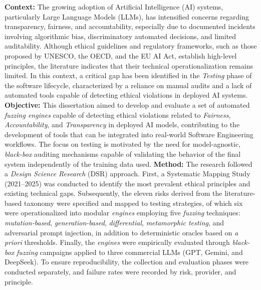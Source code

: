 \textbf{Context:} The growing adoption of Artificial Intelligence (AI) systems, particularly Large Language Models (LLMs), has intensified concerns regarding transparency, fairness, and accountability, especially due to documented incidents involving algorithmic bias, discriminatory automated decisions, and limited auditability. Although ethical guidelines and regulatory frameworks, such as those proposed by UNESCO, the OECD, and the EU AI Act, establish high-level principles, the literature indicates that their technical operationalization remains limited. In this context, a critical gap has been identified in the \textit{Testing} phase of the software lifecycle, characterized by a reliance on manual audits and a lack of automated tools capable of detecting ethical violations in deployed AI systems.
\textbf{Objective:} This dissertation aimed to develop and evaluate a set of automated \textit{fuzzing engines} capable of detecting ethical violations related to \textit{Fairness}, \textit{Accountability}, and \textit{Transparency} in deployed AI models, contributing to the development of tools that can be integrated into real-world Software Engineering workflows. The focus on testing is motivated by the need for model-agnostic, \textit{black-box} auditing mechanisms capable of validating the behavior of the final system independently of the training data used.
\textbf{Method:} The research followed a \textit{Design Science Research} (DSR) approach. First, a Systematic Mapping Study (2021--2025) was conducted to identify the most prevalent ethical principles and existing technical gaps. Subsequently, the eleven risks derived from the literature-based taxonomy were specified and mapped to testing strategies, of which six were operationalized into modular \textit{engines} employing five \textit{fuzzing} techniques: \textit{mutation-based}, \textit{generation-based}, \textit{differential}, \textit{metamorphic testing}, and adversarial prompt injection, in addition to deterministic oracles based on \textit{a priori} thresholds. Finally, the \textit{engines} were empirically evaluated through \textit{black-box} \textit{fuzzing} campaigns applied to three commercial LLMs (GPT, Gemini, and DeepSeek). To ensure reproducibility, the collection and evaluation phases were conducted separately, and failure rates were recorded by risk, provider, and principle.
